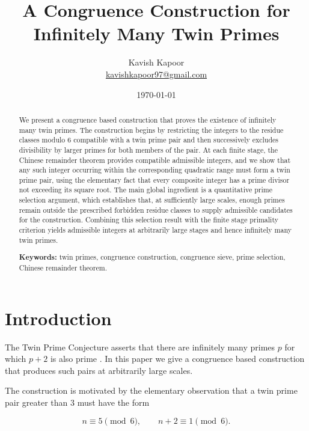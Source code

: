 \documentclass[11pt,a4paper]{article}
\title{\textbf{A Congruence Construction for Infinitely Many Twin Primes}}
\author{
    Kavish Kapoor\\
    \href{mailto:kavishkapoor97@gmail.com}{kavishkapoor97@gmail.com}
}
\date{\today}
\theoremstyle{definition}
\theoremstyle{remark}
\begin{document}
\maketitle

\begin{abstract}

We present a congruence based construction that proves the existence of infinitely many twin primes. The construction begins by restricting the integers to the residue classes modulo $6$ compatible with a twin prime pair and then successively excludes divisibility by larger primes for both members of the pair. At each finite stage, the Chinese remainder theorem provides compatible admissible integers, and we show that any such integer occurring within the corresponding quadratic range must form a twin prime pair, using the elementary fact that every composite integer has a prime divisor not exceeding its square root. The main global ingredient is a quantitative prime selection argument, which establishes that, at sufficiently large scales, enough primes remain outside the prescribed forbidden residue classes to supply admissible candidates for the construction. Combining this selection result with the finite stage primality criterion yields admissible integers at arbitrarily large stages and hence infinitely many twin primes.

\medskip

\noindent
\textbf{Keywords:}
twin primes, congruence construction, congruence sieve, prime selection,
Chinese remainder theorem.

\end{abstract}



\section{Introduction}

The Twin Prime Conjecture asserts that there are infinitely many primes
$p$ for which $p+2$ is also prime \cite{hardyWright,halberstamRichert}.
In this paper we give a congruence based construction that produces such
pairs at arbitrarily large scales.

The construction is motivated by the elementary observation that a
twin prime pair greater than $3$ must have the form

$$
n\equiv5\pmod6,
\qquad
n+2\equiv1\pmod6.
$$
\end{document}
